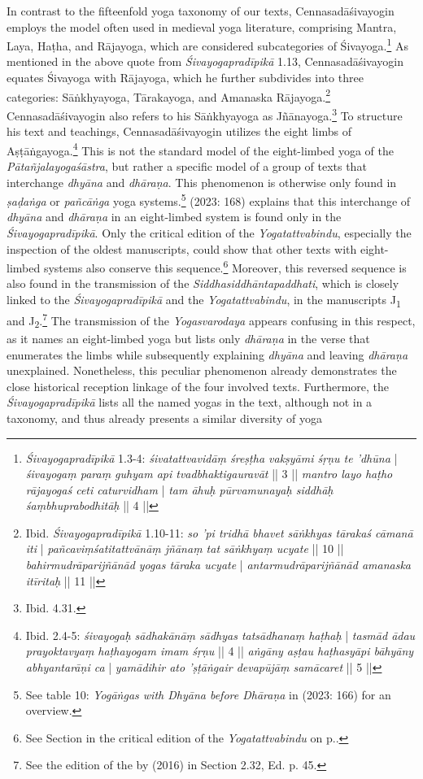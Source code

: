 In contrast to the fifteenfold yoga taxonomy of our texts, Cennasadāśivayogin employs the model often used in medieval yoga literature, comprising Mantra, Laya, Haṭha, and Rājayoga, which are considered subcategories of Śivayoga.\footnote{\textit{Śivayogapradīpikā} 1.3-4: \textit{śivatattvavidāṃ śreṣṭha vakṣyāmi śṛṇu te 'dhūna} | \textit{śivayogaṃ paraṃ guhyam api tvadbhaktigauravāt} || 3 || \textit{mantro layo haṭho rājayogaś ceti caturvidham} | \textit{tam āhuḥ pūrvamunayaḥ siddhāḥ śaṃbhuprabodhitāḥ} || 4 ||} As mentioned in the above quote from \textit{Śivayogapradīpikā} 1.13, Cennasadāśivayogin equates Śivayoga with Rājayoga, which he further subdivides into three categories: Sāṅkhyayoga, Tārakayoga, and Amanaska Rājayoga.\footnote{Ibid. \textit{Śivayogapradīpikā} 1.10-11: \textit{so 'pi tridhā bhavet sāṅkhyas tārakaś cāmanā iti} | \textit{pañcaviṃśatitattvānāṃ jñānaṃ tat sāṅkhyaṃ ucyate} || 10 || \textit{bahirmudrāparijñānād yogas tāraka ucyate} | \textit{antarmudrāparijñānād amanaska itīritaḥ} || 11 ||} Cennasadāśivayogin also refers to his Sāṅkhyayoga as Jñānayoga.\footnote{Ibid. 4.31.} To structure his text and teachings, Cennasadāśivayogin utilizes the eight limbs of Aṣṭāṅgayoga.\footnote{Ibid. 2.4-5: \textit{śivayogaḥ sādhakānāṃ sādhyas tatsādhanaṃ haṭhaḥ} | \textit{tasmād ādau prayoktavyaṃ haṭhayogam imam śṛṇu} || 4 || \textit{aṅgāny aṣṭau haṭhasyāpi bāhyāny abhyantarāṇi ca} | \textit{yamādihir ato 'ṣṭāṅgair devapūjāṃ samācaret} || 5 ||} This is not the standard model of the eight-limbed yoga of the \textit{Pātañjalayogaśāstra}, but rather a specific model of a group of texts that interchange \textit{dhyāna} and \textit{dhāraṇa}. This phenomenon is otherwise only found in \textit{ṣaḍaṅga} or \textit{pañcāṅga} yoga systems.\footnote{See table 10: \textit{Yogāṅgas with Dhyāna before Dhāraṇa} in \citeauthor{powell2023} (2023: 166) for an overview.} \citeauthor{powell2023} (2023: 168) explains that this interchange of \textit{dhyāna} and \textit{dhāraṇa} in an eight-limbed system is found only in the \textit{Śivayogapradīpikā}. Only the critical edition of the \textit{Yogatattvabindu}, especially the inspection of the oldest manuscripts, could show that other texts with eight-limbed systems also conserve this sequence.\footnote{See Section  in the critical edition of the \textit{Yogatattvabindu} on p.\pageref{ashtanga}.} Moreover, this reversed sequence is also found in the transmission of the \textit{Siddhasiddhāntapaddhati}, which is closely linked to the \textit{Śivayogapradīpikā} and the \textit{Yogatattvabindu}, in the manuscripts J\textsubscript{1} and J\textsubscript{2}.\footnote{See the edition of the  by \citeauthor{ssplonavla} (2016) in Section 2.32, Ed. p. 45.} The transmission of the \textit{Yogasvarodaya} appears confusing in this respect, as it names an eight-limbed yoga but lists only \textit{dhāraṇa} in the verse that enumerates the limbs while subsequently explaining \textit{dhyāna} and leaving \textit{dhāraṇa} unexplained. Nonetheless, this peculiar phenomenon already demonstrates the close historical reception linkage of the four involved texts. Furthermore, the \textit{Śivayogapradīpikā} lists all the named yogas in the text, although not in a taxonomy, and thus already presents a similar diversity of yoga 